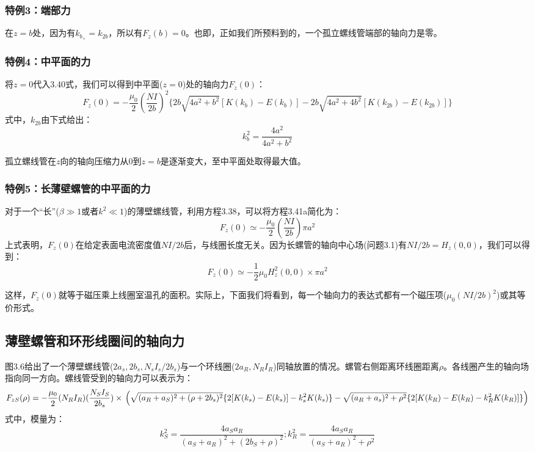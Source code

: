 \subsubsection{特例3：端部力}
在$z=b$处，因为有$k_{b_+}=k_{2b}$，所以有$F_z(b)=0$。也即，正如我们所预料到的，一个孤立螺线管端部的轴向力是零。

\subsubsection{特例4：中平面的力}
将$z=0$代入3.40式，我们可以得到中平面($z=0$)处的轴向力$F_z(0)$：
\begin{equation}
  F_z(0)=-\frac{\mu_0}{2}(\frac{NI}{2b})^2\{2b\sqrt{4a^2+b^2}[K(k_{b})-E(k_{b})]-2b\sqrt{4a^2+4b^2}[K(k_{2b})-E(k_{2b})]\}
\end{equation}
式中，$k_{2b}$由下式给出：
$$k_{b}^2=\frac{4a^2}{4a^2+b^2}$$

孤立螺线管在$z$向的轴向压缩力从$0$到$z=b$是逐渐变大，至中平面处取得最大值。

\subsubsection{特例5：长薄壁螺管的中平面的力}
对于一个“长”($\beta\gg 1$或者$k^2\ll 1$)的薄壁螺线管，利用方程3.38，可以将方程3.41a简化为：
$$F_z(0)\simeq-\frac{\mu_0}{2}(\frac{NI}{2b})\pi a^2$$
上式表明，$F_z(0)$在给定表面电流密度值$NI/2b$后，与线圈长度无关。因为长螺管的轴向中心场(问题3.1)有$NI/2b=H_z(0,0)$，我们可以得到：
$$F_z(0)\simeq -\frac{1}{2}\mu_0 H_z^2(0,0)\times\pi a^2$$

这样，$F_z(0)$就等于磁压乘上线圈室温孔的面积。实际上，下面我们将看到，每一个轴向力的表达式都有一个磁压项($\mu_0(NI/2b)^2$)或其等价形式。

\subsection{薄壁螺管和环形线圈间的轴向力}
图3.6给出了一个薄壁螺线管($2a_s,2b_s,N_s I_s/2b_s$)与一个环线圈($2a_R,N_R I_R$)同轴放置的情况。螺管右侧距离环线圈距离$\rho$。各线圈产生的轴向场指向同一方向。螺线管受到的轴向力可以表示为：
\begin{equation}
F_{zS}(\rho)=-\frac{\mu_0}{2}(N_R I_R)(\frac{N_S I_S}{2b_s})\times\\
\left(\sqrt{(a_R+a_S)^2+(\rho+2b_s)^2}\{2[K(k_s)-E(k_s)]-k_s^2K(k_s)\}\\
-\sqrt{(a_R+a_s)^2+\rho^2}\{2[K(k_R)-E(k_R)-k_R^2K(k_R)]\}\right)
\end{equation}
式中，模量为：
$$k_{S}^2=\frac{4a_S a_R}{(a_S+a_R)^2+(2b_S+\rho)^2} ; k_{R}^2=\frac{4a_S a_R}{(a_S+a_R)^2+\rho^2} $$

